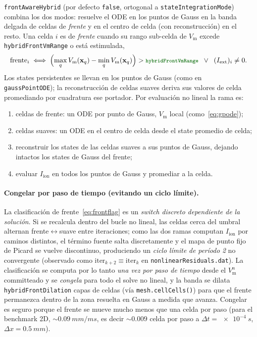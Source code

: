 \documentclass[11pt,a4paper]{article}
\newcommand{\code}[1]{\texttt{\small #1}}
\newcommand{\Vm}{V_{\text{m}}}
\newcommand{\Iion}{I_{\mathrm{ion}}}
\newcommand{\Iext}{I_{\mathrm{ext}}}
\newcommand{\dictkey}[1]{\textcolor{black!60!green}{\texttt{\footnotesize #1}}}
\begin{document}
\dictkey{frontAwareHybrid} (por defecto \code{false}, ortogonal a
\dictkey{stateIntegrationMode}) combina los dos modos: resuelve el ODE
en los puntos de Gauss en la banda delgada de celdas de \emph{frente} y en el
centro de celda (con reconstrucción) en el resto. Una celda $i$ es de \emph{frente}
cuando su rango sub-celda de $\Vm$ excede \dictkey{hybridFrontVmRange} o está
estimulada,
\begin{equation}
  \text{frente}_i \;\Longleftrightarrow\;
  \Bigl(\max_q\Vm(\mathbf{x}_q)-\min_q\Vm(\mathbf{x}_q)\Bigr)
     > \dictkey{hybridFrontVmRange}
  \;\;\vee\;\; (\Iext)_i\neq 0 .
  \label{eq:frontflag}
\end{equation}
Los states persistentes se llevan en los puntos de Gauss (como en
\code{gaussPointODE}); la reconstrucción de celdas suaves deriva sus valores de
celda promediando por cuadratura ese portador. Por evaluación no lineal la rama es:
\begin{enumerate}[topsep=2pt,itemsep=1pt,label=(\alph*)]
  \item celdas de frente: un ODE por punto de Gauss, $\Vm$ local (como~\eqref{eq:gpode});
  \item celdas suaves: un ODE en el centro de celda desde el state promedio de celda;
  \item reconstruir los states de las celdas suaves a sus puntos de Gauss, dejando
        intactos los states de Gauss del frente;
  \item evaluar $\Iion$ en todos los puntos de Gauss y promediar a la celda.
\end{enumerate}

\paragraph{Congelar por paso de tiempo (evitando un ciclo límite).}
La clasificación de frente~\eqref{eq:frontflag} es un \emph{switch discreto
dependiente de la solución}. Si se recalcula dentro del bucle no lineal, las celdas
cerca del umbral alternan frente$\leftrightarrow$suave entre iteraciones; como las
dos ramas computan $\Iion$ por caminos distintos, el término fuente salta
discretamente y el mapa de punto fijo de Picard se vuelve discontinuo, produciendo
un \emph{ciclo límite de período 2} no convergente (observado como
$\text{iter}_{k+2}\equiv\text{iter}_k$ en \code{nonlinearResiduals.dat}). La
clasificación se computa por lo tanto \emph{una vez por paso de tiempo} desde el
$\Vm^{n}$ committeado y se \emph{congela} para todo el solve no lineal, y la banda
se dilata \dictkey{hybridFrontDilation} capas de celdas (vía
\code{mesh.cellCells()}) para que el frente permanezca dentro de la zona resuelta
en Gauss a medida que avanza. Congelar es seguro porque el frente se mueve mucho
menos que una celda por paso (para el benchmark 2D, $\sim\!\SI{0.09}{mm/ms}$, es
decir $\sim\!0.009$ celda por paso a $\Delta t=\SI{e-4}{s}$, $\Delta x=\SI{0.5}{mm}$).
\end{document}
